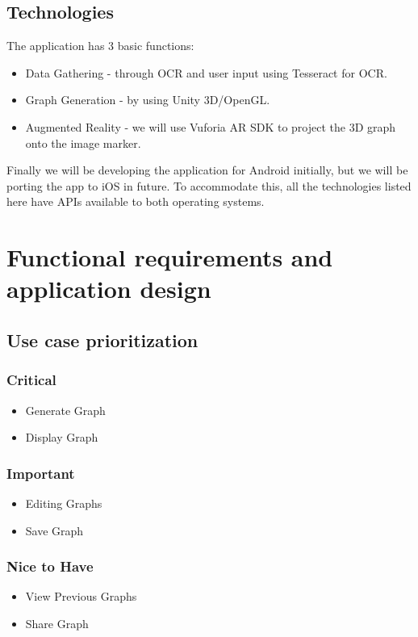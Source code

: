 \documentclass[a4paper,12pt]{article}
\begin{document}
\subsection{Technologies}
The application has 3 basic functions:
\begin{itemize}
	\item Data Gathering - through OCR and user input using Tesseract for OCR.
	\item Graph Generation - by using Unity 3D/OpenGL.
	\item Augmented Reality - we will use Vuforia AR SDK to project the 3D graph onto the image marker.	
\end{itemize}

Finally we will be developing the application for Android initially, but we will be porting the app to iOS in future. To accommodate this, all the technologies listed here have APIs available to both operating systems.

\newpage
\section{Functional requirements and application design}

\subsection{Use case prioritization}
	\subsubsection{Critical}
		\begin{itemize}
			\item Generate Graph
			\item Display Graph
		\end{itemize}
	\subsubsection{Important}
		\begin{itemize}
			\item Editing Graphs
			\item Save Graph
		\end{itemize}
	\subsubsection{Nice to Have}
		\begin{itemize}
			\item View Previous Graphs
			\item Share Graph
		\end{itemize}
\end{document}
